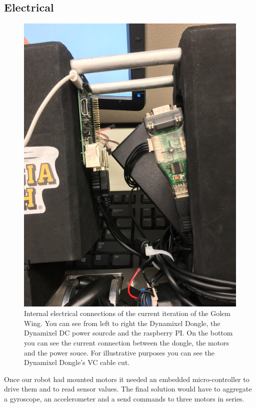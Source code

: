\documentclass[12pt,conference,onecolumn,titlepage]{IEEEtran} %
\begin{document}
\subsection{Electrical}
\label{sec:electrical}
\begin{figure}
  \centering
  \includegraphics[width=1.0\textwidth]{cables.jpg}
  \caption{Internal electrical connections of the current iteration of the Golem Wing. You can see from left to right the Dynamixel Dongle, the Dynamixel DC power sourcde and the raspberry PI. On the bottom you can see the current connection between the dongle, the motors and the power souce. For illustrative purposes you can see the Dynamixel Dongle's VC cable cut.}
  \label{fig:cables}
\end{figure}
Once our robot had mounted motors it needed an embedded micro-controller to drive them and to read sensor values. The final solution would have to aggregate a gyroscope, an accelerometer and a send commands to three motors in series.\par
\end{document}

